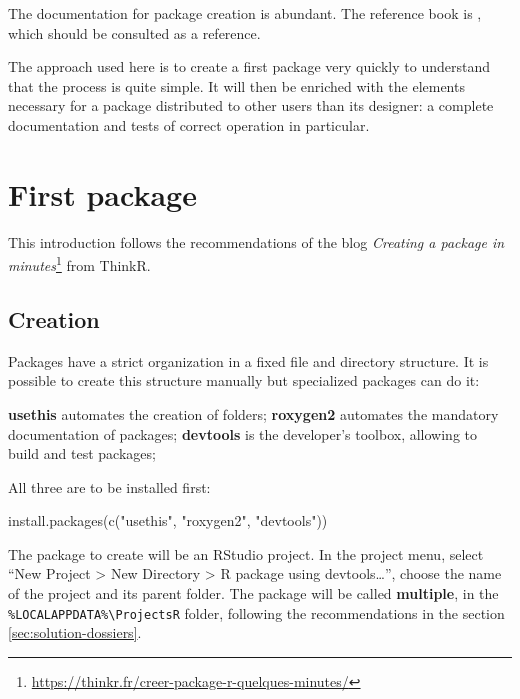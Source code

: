 \documentclass[
  12pt,
  american,
  a4paper,
  extrafontsizes,onecolumn,openright
  ]{memoir}
\newenvironment{Shaded}{\begin{snugshade}}{\end{snugshade}}
\newcommand{\FunctionTok}[1]{\textcolor[rgb]{0.00,0.00,0.00}{#1}}
\newcommand{\NormalTok}[1]{#1}
\newcommand{\StringTok}[1]{\textcolor[rgb]{0.31,0.60,0.02}{#1}}
\begin{document}
The documentation for package creation is abundant.
The reference book is \textcite{Wickham2015}, which should be consulted as a reference.

The approach used here is to create a first package very quickly to understand that the process is quite simple.
It will then be enriched with the elements necessary for a package distributed to other users than its designer: a complete documentation and tests of correct operation in particular.

\hypertarget{first-package}{%
\section{First package}\label{first-package}}

This introduction follows the recommendations of the blog \emph{Creating a package in minutes}\footnote{\url{https://thinkr.fr/creer-package-r-quelques-minutes/}} from ThinkR.

\hypertarget{creation}{%
\subsection{Creation}\label{creation}}

Packages have a strict organization in a fixed file and directory structure.
It is possible to create this structure manually but specialized packages can do it:

\textbf{usethis} automates the creation of folders;
\textbf{roxygen2} automates the mandatory documentation of packages;
\textbf{devtools} is the developer's toolbox, allowing to build and test packages;

All three are to be installed first:

\scriptsize

\begin{Shaded}
\begin{Highlighting}[]
\FunctionTok{install.packages}\NormalTok{(}\FunctionTok{c}\NormalTok{(}\StringTok{"usethis"}\NormalTok{, }\StringTok{"roxygen2"}\NormalTok{, }\StringTok{"devtools"}\NormalTok{))}
\end{Highlighting}
\end{Shaded}

\normalsize

The package to create will be an RStudio project.
In the project menu, select \enquote{New Project \textgreater{} New Directory \textgreater{} R package using devtools\ldots{}}, choose the name of the project and its parent folder.
The package will be called \textbf{multiple}, in the \texttt{\%LOCALAPPDATA\%\textbackslash{}ProjectsR} folder, following the recommendations in the section \ref{sec:solution-dossiers}.
\end{document}
